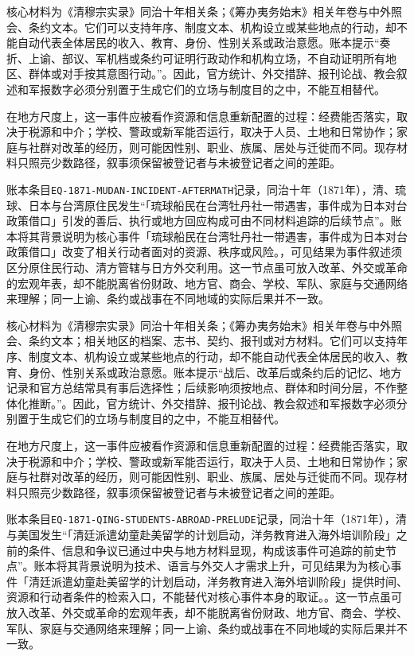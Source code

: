 核心材料为《清穆宗实录》同治十年相关条；《筹办夷务始末》相关年卷与中外照会、条约文本。它们可以支持年序、制度文本、机构设立或某些地点的行动，却不能自动代表全体居民的收入、教育、身份、性别关系或政治意愿。账本提示“奏折、上谕、部议、军机档或条约可证明行政动作和机构立场，不自动证明所有地区、群体或对手按其意图行动。”。因此，官方统计、外交措辞、报刊论战、教会叙述和军报数字必须分别置于生成它们的立场与制度目的之中，不能互相替代。

在地方尺度上，这一事件应被看作资源和信息重新配置的过程：经费能否落实，取决于税源和中介；学校、警政或新军能否运行，取决于人员、土地和日常协作；家庭与社群对改革的经历，则可能因性别、职业、族属、居处与迁徙而不同。现存材料只照亮少数路径，叙事须保留被登记者与未被登记者之间的差距。

账本条目\texttt{EQ-1871-MUDAN-INCIDENT-AFTERMATH}记录，同治十年（1871年），清、琉球、日本与台湾原住民发生“「琉球船民在台湾牡丹社一带遇害，事件成为日本对台政策借口」引发的善后、执行或地方回应构成可由不同材料追踪的后续节点”。账本将其背景说明为核心事件「琉球船民在台湾牡丹社一带遇害，事件成为日本对台政策借口」改变了相关行动者面对的资源、秩序或风险。，可见结果为事件叙述须区分原住民行动、清方管辖与日方外交利用。这一节点虽可放入改革、外交或革命的宏观年表，却不能脱离省份财政、地方官、商会、学校、军队、家庭与交通网络来理解；同一上谕、条约或战事在不同地域的实际后果并不一致。

核心材料为《清穆宗实录》同治十年相关条；《筹办夷务始末》相关年卷与中外照会、条约文本；相关地区的档案、志书、契约、报刊或对方材料。它们可以支持年序、制度文本、机构设立或某些地点的行动，却不能自动代表全体居民的收入、教育、身份、性别关系或政治意愿。账本提示“战后、改革后或条约后的记忆、地方记录和官方总结常具有事后选择性；后续影响须按地点、群体和时间分层，不作整体化推断。”。因此，官方统计、外交措辞、报刊论战、教会叙述和军报数字必须分别置于生成它们的立场与制度目的之中，不能互相替代。

在地方尺度上，这一事件应被看作资源和信息重新配置的过程：经费能否落实，取决于税源和中介；学校、警政或新军能否运行，取决于人员、土地和日常协作；家庭与社群对改革的经历，则可能因性别、职业、族属、居处与迁徙而不同。现存材料只照亮少数路径，叙事须保留被登记者与未被登记者之间的差距。

账本条目\texttt{EQ-1871-QING-STUDENTS-ABROAD-PRELUDE}记录，同治十年（1871年），清与美国发生“「清廷派遣幼童赴美留学的计划启动，洋务教育进入海外培训阶段」之前的条件、信息和争议已通过中央与地方材料显现，构成该事件可追踪的前史节点”。账本将其背景说明为技术、语言与外交人才需求上升，可见结果为为核心事件「清廷派遣幼童赴美留学的计划启动，洋务教育进入海外培训阶段」提供时间、资源和行动者条件的检索入口，不能替代对核心事件本身的取证。。这一节点虽可放入改革、外交或革命的宏观年表，却不能脱离省份财政、地方官、商会、学校、军队、家庭与交通网络来理解；同一上谕、条约或战事在不同地域的实际后果并不一致。

